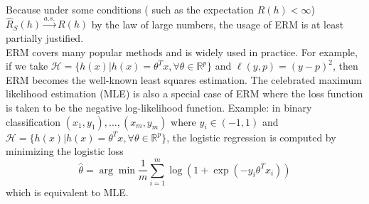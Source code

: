 \noindent Because under some conditions ( such as the expectation $R(h) < \infty $)\\  $\hat{R}_S(h) \xrightarrow{a.s.} R(h)$ by the law of large numbers, the usage of ERM is at least partially justified.\\

\noindent ERM covers many popular methods and is widely used in practice. For example, if we take $\mathcal{H} = \{h(x) | h(x)=\theta^Tx, \forall \theta \in \mathbb{R}^p\}$ and $\ell(y,p) = (y-p)^2$, then ERM becomes the well-known least squares estimation.
The celebrated maximum likelihood estimation (MLE) is also a special case of ERM where the loss function
is taken to be the negative log-likelihood function. Example: in binary classification $(x_1, y_1),..., (x_m,y_m)$
where $y_i \in (-1, 1)$ and $\mathcal{H} = \{h(x) | h(x)=\theta^Tx, \forall \theta \in \mathbb{R}^p\}$, the logistic regression is computed by minimizing the logistic loss
\begin{equation}
\hat{\theta} = \arg\min{\frac{1}{m}} \sum_{i=1}^{m}\log(1+\exp(-y_i\theta^T x_i))
\end{equation}
which is equivalent to MLE.

